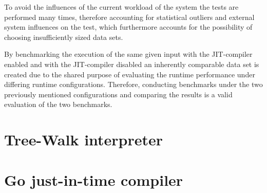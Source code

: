 To avoid the influences of the current workload of the system the tests are
performed many times, therefore accounting for statistical outliers and
external system influences on the test, which furthermore accounts for the
possibility of choosing insufficiently sized data sets.

By benchmarking the execution of the same given input with the JIT-compiler
enabled and with the JIT-compiler disabled an inherently comparable data set is
created due to the shared purpose of evaluating the runtime performance under
differing runtime configurations. Therefore, conducting benchmarks under the
two previously mentioned configurations and comparing the results is a valid
evaluation of the two benchmarks.


\section{Tree-Walk interpreter} 

\section{Go just-in-time compiler}
